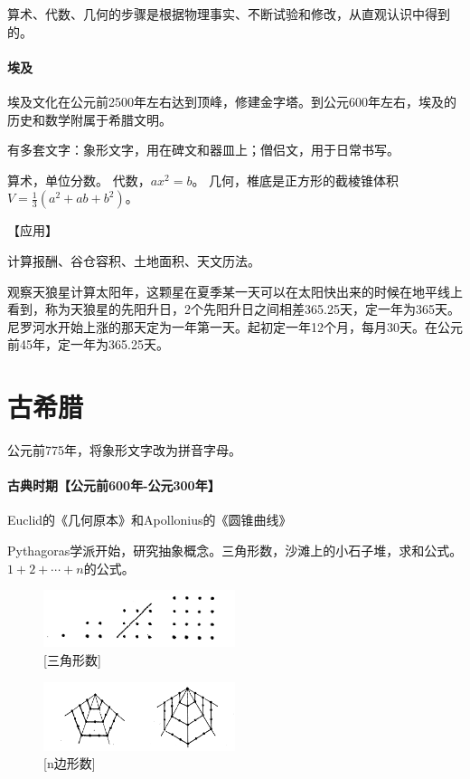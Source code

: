 \documentclass[UTF8]{../09-Mathematics}
\begin{document}
算术、代数、几何的步骤是根据物理事实、不断试验和修改，从直观认识中得到的。


\paragraph{埃及}

埃及文化在公元前2500年左右达到顶峰，修建金字塔。到公元600年左右，埃及的历史和数学附属于希腊文明。

有多套文字：象形文字，用在碑文和器皿上；僧侣文，用于日常书写。

算术，单位分数。
代数，$ax^2 = b$。
几何，椎底是正方形的截棱锥体积$V = \frac{1}{3}(a^2+ab + b^2)$。


【应用】

计算报酬、谷仓容积、土地面积、天文历法。

观察天狼星计算太阳年，这颗星在夏季某一天可以在太阳快出来的时候在地平线上看到，称为天狼星的先阳升日，2个先阳升日之间相差365.25天，定一年为365天。尼罗河水开始上涨的那天定为一年第一天。起初定一年12个月，每月30天。在公元前45年，定一年为365.25天。



\section{古希腊}

公元前775年，将象形文字改为拼音字母。


\paragraph{古典时期【公元前600年-公元300年】}
Euclid的《几何原本》和Apollonius的《圆锥曲线》

Pythagoras学派开始，研究抽象概念。三角形数，沙滩上的小石子堆，求和公式。$1 + 2 + \cdots + n$的公式。

\begin{figure}[h]
    \centering
    \includegraphics[width=0.5\textwidth]{./resources/古今数学思想-图3_2.png}
    \caption{[三角形数]}
    \label{fig:1}
\end{figure}

\begin{figure}[h]
    \centering
    \includegraphics[width=0.5\textwidth]{./resources/古今数学思想-图3_5.png}
    \caption{[n边形数]}
    \label{fig:2}
\end{figure}
\end{document}
